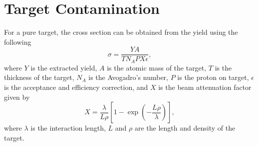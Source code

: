 \documentclass[../main.tex]{subfiles}
\begin{document}
\section{Target Contamination}
For a pure target, the cross section can be obtained from the yield using the following
\begin{equation}
	\sigma = \frac{Y A}{T N_A P X \epsilon},
\end{equation}
where $Y$ is the extracted yield, $A$ is the atomic mass of the target,
$T$ is the thickness of the target, $N_A$ is the Avogadro’s number,
$P$ is the proton on target, $\epsilon$ is the acceptance and efficiency correction,
and $X$ is the beam attenuation factor given by
\begin{equation}
	X=\frac{\lambda}{L\rho} \left[1-\exp\left(-\frac{L\rho}{\lambda}\right)\right],
\end{equation}
where $\lambda$ is the interaction length, $L$ and $\rho$ are the length and density
of the target.
\end{document}
